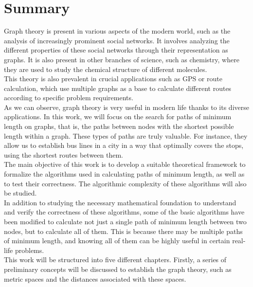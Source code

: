 %

\chapter{Summary}

Graph theory is present in various aspects of the modern world, such as the analysis of increasingly prominent social networks. It involves analyzing the different properties of these social networks through their representation as graphs. It is also present in other branches of science, such as chemistry, where they are used to study the chemical structure of different molecules. \\

This theory is also prevalent in crucial applications such as GPS or route calculation, which use multiple graphs as a base to calculate different routes according to specific problem requirements. \\ 

As we can observe, graph theory is very useful in modern life thanks to its diverse applications. In this work, we will focus on the search for paths of minimum length on graphs, that is, the paths between nodes with the shortest possible length within a graph. These types of paths are truly valuable. For instance, they allow us to establish bus lines in a city in a way that optimally covers the stops, using the shortest routes between them. \\

The main objective of this work is to develop a suitable theoretical framework to formalize the algorithms used in calculating paths of minimum length, as well as to test their correctness. The algorithmic complexity of these algorithms will also be studied. \\

In addition to studying the necessary mathematical foundation to understand and verify the correctness of these algorithms, some of the basic algorithms have been modified to calculate not just a single path of minimum length between two nodes, but to calculate all of them. This is because there may be multiple paths of minimum length, and knowing all of them can be highly useful in certain real-life problems. \\

This work will be structured into five different chapters. Firstly, a series of preliminary concepts will be discussed to establish the graph theory, such as metric spaces and the distances associated with these spaces. \\

